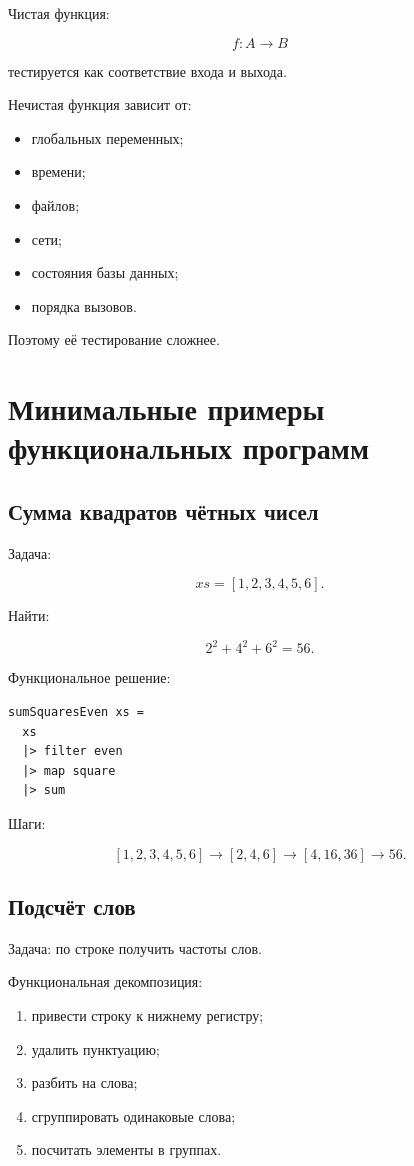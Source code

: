 \documentclass[12pt,a4paper]{article}
\begin{document}
Чистая функция:

\[
f : A \to B
\]

тестируется как соответствие входа и выхода.

Нечистая функция зависит от:

\begin{itemize}
  \item глобальных переменных;
  \item времени;
  \item файлов;
  \item сети;
  \item состояния базы данных;
  \item порядка вызовов.
\end{itemize}

Поэтому её тестирование сложнее.

\section{Минимальные примеры функциональных программ}

\subsection{Сумма квадратов чётных чисел}

Задача:

\[
xs = [1,2,3,4,5,6].
\]

Найти:

\[
2^2 + 4^2 + 6^2 = 56.
\]

Функциональное решение:

\begin{lstlisting}
sumSquaresEven xs =
  xs
  |> filter even
  |> map square
  |> sum
\end{lstlisting}

Шаги:

\[
[1,2,3,4,5,6]
\to
[2,4,6]
\to
[4,16,36]
\to
56.
\]

\subsection{Подсчёт слов}

Задача: по строке получить частоты слов.

Функциональная декомпозиция:

\begin{enumerate}
  \item привести строку к нижнему регистру;
  \item удалить пунктуацию;
  \item разбить на слова;
  \item сгруппировать одинаковые слова;
  \item посчитать элементы в группах.
\end{enumerate}
\end{document}
